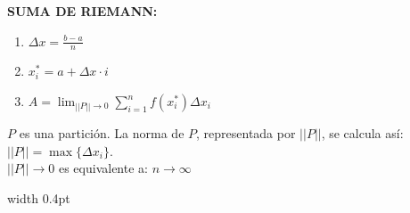 \documentclass[10pt, letterpaper, landscape]{article}
\begin{document}
\begin{minipage}[t]{8.3cm}
    \vspace{0.15cm}
    \begin{tcolorbox}[colback=white, colframe=black, boxrule=0.5pt, arc=0pt, auto outer arc, left=2pt, right=2pt, top=2pt, bottom=2pt, boxsep=1pt, before=\vspace{4pt}, after=\vspace{4pt}]
        \textbf{\normalsize SUMA DE RIEMANN:}
        \begin{enumerate}[label=\arabic*., itemsep=1pt, leftmargin=12pt]
            \item $\Delta x = \frac{b-a}{n}$
            \item $x_i^* = a + \Delta x \cdot i$
            \item $A = \lim_{||P|| \to 0} \sum_{i=1}^n f(x_i^*) \Delta x_i$
        \end{enumerate}
        {\scriptsize $P$ es una partición. La norma de $P$, representada por $||P||$, se calcula así: $||P|| = \max\{\Delta x_i\}$. \\ $||P|| \to 0$ es equivalente a: $n \to \infty$}
    \end{tcolorbox}
\end{minipage}%
\hfill
\vrule width 0.4pt
\hfill
\end{document}
